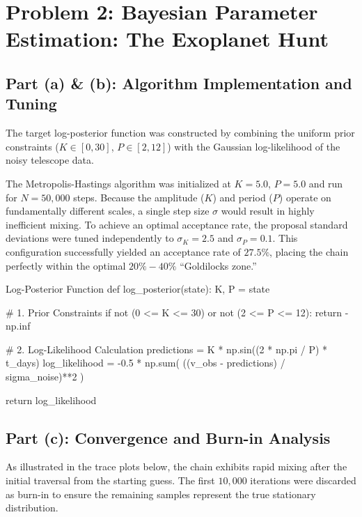 \documentclass{article}
\begin{document}
\newpage

\section*{Problem 2: Bayesian Parameter Estimation: The Exoplanet Hunt}

\subsection*{Part (a) \& (b): Algorithm Implementation and Tuning}
The target log-posterior function was constructed by combining the uniform prior constraints ($K \in [0, 30]$, $P \in [2, 12]$) with the Gaussian log-likelihood of the noisy telescope data. 

The Metropolis-Hastings algorithm was initialized at $K=5.0$, $P=5.0$ and run for $N=50,000$ steps. Because the amplitude ($K$) and period ($P$) operate on fundamentally different scales, a single step size $\sigma$ would result in highly inefficient mixing. To achieve an optimal acceptance rate, the proposal standard deviations were tuned independently to $\sigma_K = 2.5$ and $\sigma_P = 0.1$. This configuration successfully yielded an acceptance rate of $27.5\%$, placing the chain perfectly within the optimal $20\% - 40\%$ ``Goldilocks zone.''

\begin{pythonbox}{Log-Posterior Function}
def log_posterior(state):
    K, P = state
    
    # 1. Prior Constraints
    if not (0 <= K <= 30) or not (2 <= P <= 12):
        return -np.inf 
        
    # 2. Log-Likelihood Calculation
    predictions = K * np.sin((2 * np.pi / P) * t_days)
    log_likelihood = -0.5 * np.sum( ((v_obs - predictions) / sigma_noise)**2 )
    
    return log_likelihood
\end{pythonbox}

\subsection*{Part (c): Convergence and Burn-in Analysis}
As illustrated in the trace plots below, the chain exhibits rapid mixing after the initial traversal from the starting guess. The first $10,000$ iterations were discarded as burn-in to ensure the remaining samples represent the true stationary distribution.
\end{document}
